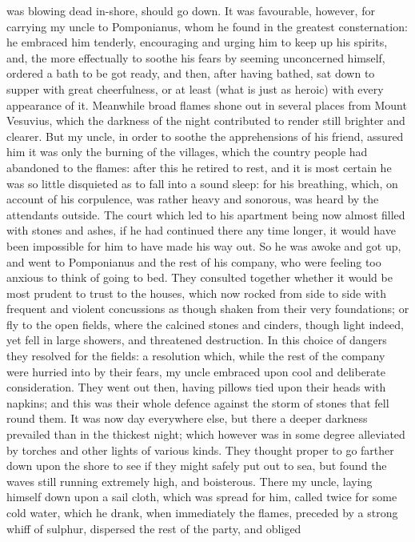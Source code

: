 was blowing dead in-shore, should go down. It was favourable, however, for
carrying my uncle to Pomponianus, whom he found in the greatest
consternation: he embraced him tenderly, encouraging and urging him to
keep up his spirits, and, the more effectually to soothe his fears by
seeming unconcerned himself, ordered a bath to be got ready, and then,
after having bathed, sat down to supper with great cheerfulness, or at
least (what is just as heroic) with every appearance of it. Meanwhile
broad flames shone out in several places from Mount Vesuvius, which the
darkness of the night contributed to render still brighter and clearer.
But my uncle, in order to soothe the apprehensions of his friend, assured
him it was only the burning of the villages, which the country people had
abandoned to the flames: after this he retired to rest, and it is most
certain he was so little disquieted as to fall into a sound sleep: for his
breathing, which, on account of his corpulence, was rather heavy and
sonorous, was heard by the attendants outside. The court which led to his
apartment being now almost filled with stones and ashes, if he had
continued there any time longer, it would have been impossible for him to
have made his way out. So he was awoke and got up, and went to Pomponianus
and the rest of his company, who were feeling too anxious to think of
going to bed. They consulted together whether it would be most prudent to
trust to the houses, which now rocked from side to side with frequent and
violent concussions as though shaken from their very foundations; or fly
to the open fields, where the calcined stones and cinders, though light
indeed, yet fell in large showers, and threatened destruction. In this
choice of dangers they resolved for the fields: a resolution which, while
the rest of the company were hurried into by their fears, my uncle
embraced upon cool and deliberate consideration. They went out then,
having pillows tied upon their heads with napkins; and this was their
whole defence against the storm of stones that fell round them. It was now
day everywhere else, but there a deeper darkness prevailed than in the
thickest night; which however was in some degree alleviated by torches and
other lights of various kinds. They thought proper to go farther down upon
the shore to see if they might safely put out to sea, but found the waves
still running extremely high, and boisterous. There my uncle, laying
himself down upon a sail cloth, which was spread for him, called twice for
some cold water, which he drank, when immediately the flames, preceded by
a strong whiff of sulphur, dispersed the rest of the party, and obliged
